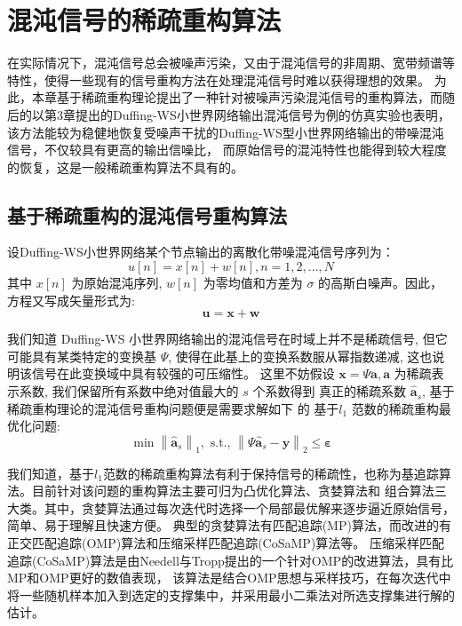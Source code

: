 \chapter{混沌信号的稀疏重构算法}
在实际情况下，混沌信号总会被噪声污染，又由于混沌信号的非周期、宽带频谱等特性，使得一些现有的信号重构方法在处理混沌信号时难以获得理想的效果。
为此，本章基于稀疏重构理论提出了一种针对被噪声污染混沌信号的重构算法，而随后的以第3章提出的Duffing-WS小世界网络输出混沌信号为例的仿真实验也表明，该方法能较为稳健地恢复受噪声干扰的Duffing-WS型小世界网络输出的带噪混沌信号，不仅较具有更高的输出信噪比， 而原始信号的混沌特性也能得到较大程度的恢复，这是一般稀疏重构算法不具有的。

\section{基于稀疏重构的混沌信号重构算法}
设Duffing-WS小世界网络某个节点输出的离散化带噪混沌信号序列为：
\begin{equation}
    u[n]=x[n]+w[n], n=1,2, \ldots, N
\end{equation}
其中 $x[n]$ 为原始混沌序列, $w[n]$ 为零均值和方差为 $\sigma$ 的高斯白噪声。因此，方程又写成矢量形式为:
\begin{equation}
    \boldsymbol{u}=\boldsymbol{x}+\boldsymbol{w}
\end{equation}

我们知道 Duffing-WS 小世界网络输出的混沌信号在时域上并不是稀疏信号,
但它可能具有某类特定的变换基 $\Psi$, 使得在此基上的变换系数服从幂指数递减,
这也说明该信号在此变换域中具有较强的可压缩性。
这里不妨假设 $\boldsymbol{x}=\Psi \boldsymbol{a}, \boldsymbol{a}$ 为稀疏表示系数,
我们保留所有系数中绝对值最大的 $s$ 个系数得到 真正的稀疏系数 $\hat{\boldsymbol{a}}_s$,
基于稀疏重构理论的混沌信号重构问题便是需要求解如下 的 基于$l_1$ 范数的稀疏重构最优化问题:
\begin{equation}
    \min \left\|\hat{\boldsymbol{a}}_s\right\|_1, \text { s.t., }\left\|\Psi \hat{\boldsymbol{a}}_s-\boldsymbol{y}\right\|_2 \leq \boldsymbol{\varepsilon}
\end{equation}\par
我们知道，基于$l_1$范数的稀疏重构算法有利于保持信号的稀疏性，也称为基追踪算法。目前针对该问题的重构算法主要可归为凸优化算法、贪婪算法和
组合算法三大类。其中，贪婪算法通过每次迭代时选择一个局部最优解来逐步逼近原始信号，简单、易于理解且快速方便。
典型的贪婪算法有匹配追踪(MP)算法，而改进的有正交匹配追踪(OMP)算法和压缩采样匹配追踪(CoSaMP)算法等。
压缩采样匹配追踪(CoSaMP)算法是由Needell与Tropp提出的一个针对OMP的改进算法，具有比MP和OMP更好的数值表现，
该算法是结合OMP思想与采样技巧，在每次迭代中将一些随机样本加入到选定的支撑集中，并采用最小二乘法对所选支撑集进行解的估计。

